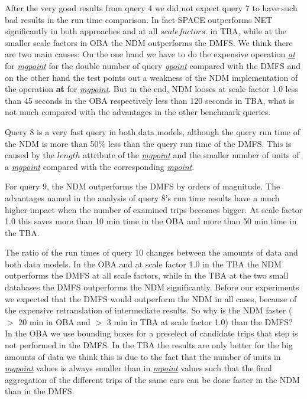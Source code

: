 \documentclass[a4paper]{article}
\newcommand{\op}[1]{\textbf{#1}}
\newcommand{\dt}[1]{\textsl{\underline{#1}}}
\begin{document}
After the very good results from query 4 we did not expect query 7 to have such
bad results in the run time comparison. In fact SPACE outperforms NET significantly
in both approaches and at all $scalefactors$. in TBA, while at the smaller scale factors in
OBA the NDM outperforms the DMFS. We think there are two main causes: On the one hand we
have to do the expensive operation \dt{at} for \dt{mgpoint} for the double number
of query \dt{gpoint} compared with the DMFS and
on the other hand the test points out a weakness of the NDM
implementation of the operation \op{at} for \dt{mgpoint}. But in the end, NDM looses
at scale factor 1.0 less than 45 seconds in the OBA respectively less
than 120 seconds in TBA, what is not much compared with the advantages in the
other benchmark queries.

Query 8 is a very fast query in both data models, although the query run time of
the NDM is more than 50\% less than the query run time of the
DMFS. This is caused by the
$length$ attribute of the \dt{mgpoint} and the smaller number of units of a
\dt{mgpoint} compared with the corresponding \dt{mpoint}.

For query 9, the NDM outperforms the DMFS by orders of magnitude. The advantages
named in the analysis of query 8's run time results have a much higher impact
when the number of examined trips becomes bigger. At scale factor 1.0 this saves
more than 10 min time in the OBA and more than 50 min time in the TBA.

The ratio of the run times of query 10 changes between the amounts of data and
both data models. In the OBA and at scale factor 1.0 in the TBA the NDM outperforms
the DMFS at all scale factors, while in the TBA at the two small databases the
DMFS outperforms the NDM significantly. Before our experiments we expected that
the DMFS would outperform the NDM in all cases, because of the expensive
retranslation of intermediate results. So why is the NDM faster ($>$ 20 min in
OBA and $>$ 3 min in TBA at scale factor 1.0) than the DMFS?
In the OBA we use bounding boxes for a preselect of candidate trips that step is not
performed in the DMFS. In the TBA the results are only better for the big amounts
of data we think this is due to the fact that the number of units in \dt{mgpoint}
values is always smaller than in \dt{mpoint} values such that the final aggregation
of the different trips of the same cars can be done faster in the NDM
than in the DMFS.
\end{document}
